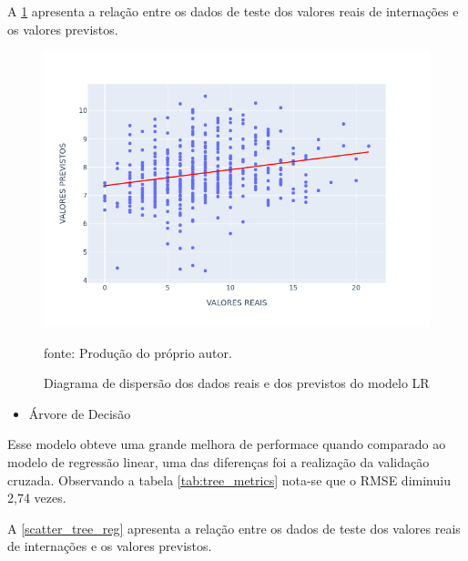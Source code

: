 \documentclass[
  12pt,		%
  a4paper,	%
  openright,%
  oneside,	%
  chapter=TITLE,		%
  section=TITLE,		%
  english,	%
  french,	%
  spanish,	%
  brazil	%
]{abntex2}
\begin{document}
    A \ref*{scatter_lin_reg} apresenta a relação entre os dados de teste dos valores reais de internações e os valores previstos.

    \begin{figure}[ht]
        \centering
        \caption{Diagrama de dispersão dos dados reais e dos previstos do modelo LR}
        \includegraphics[width=12cm]{../reports/figures/scatter_lin_reg.png}
        \label{scatter_lin_reg}
        \par
        {\small fonte: Produção do próprio autor.}
    \end{figure}

    \begin{itemize}
        \item Árvore de Decisão
    \end{itemize}

    Esse modelo obteve uma grande melhora de performace quando comparado ao modelo de regressão linear, uma das diferenças foi
    a realização da validação cruzada. Observando a tabela \ref*{tab:tree_metrics} nota-se que o RMSE diminuiu 2,74 vezes.


    

    A \ref*{scatter_tree_reg} apresenta a relação entre os dados de teste dos valores reais de internações e os valores previstos.
\end{document}
